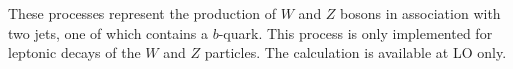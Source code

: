 These processes represent the production of $W$ and $Z$
bosons in association with two jets, one of which contains a $b$-quark.
This process is only implemented for leptonic decays of the
$W$ and $Z$ particles. The calculation is available at LO only.


